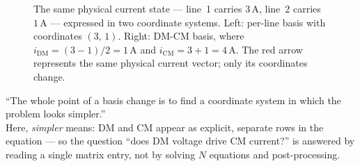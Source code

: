 \begin{figure}[H]

\caption{The same physical current state — line~1 carries $3\,\mathrm{A}$,
line~2 carries $1\,\mathrm{A}$ — expressed in two coordinate systems.
Left: per-line basis with coordinates $(3,\,1)$.
Right: DM-CM basis, where $i_{\mathrm{DM}}=(3-1)/2=1\,\mathrm{A}$ and
$i_{\mathrm{CM}}=3+1=4\,\mathrm{A}$.
The red arrow represents the same physical current vector; only its coordinates change.}

\label{fig:appA_basis_change}

\end{figure}

\begin{statebox}
``The whole point of a basis change is to find a coordinate system
in which the problem looks simpler.''\\[4pt]
Here, \emph{simpler} means: DM and CM appear as explicit, separate
rows in the equation — so the question ``does DM voltage drive CM
current?'' is answered by reading a single matrix entry, not by
solving $N$ equations and post-processing.
\end{statebox}

